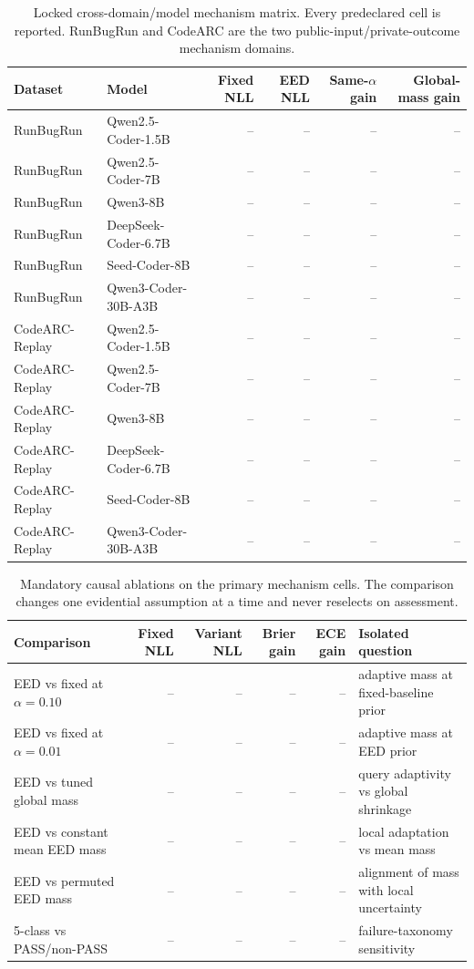 \begin{table}[t]
\centering
\caption{Locked cross-domain/model mechanism matrix. Every predeclared cell is reported.
RunBugRun and CodeARC are the two public-input/private-outcome mechanism domains.}
\label{tab:eesd-mechanism-matrix}
\small
\begin{tabular}{llrrrr}
\toprule
Dataset & Model & Fixed NLL & EED NLL & Same-$\alpha$ gain & Global-mass gain \\
\midrule
RunBugRun & Qwen2.5-Coder-1.5B & -- & -- & -- & -- \\
RunBugRun & Qwen2.5-Coder-7B & -- & -- & -- & -- \\
RunBugRun & Qwen3-8B & -- & -- & -- & -- \\
RunBugRun & DeepSeek-Coder-6.7B & -- & -- & -- & -- \\
RunBugRun & Seed-Coder-8B & -- & -- & -- & -- \\
RunBugRun & Qwen3-Coder-30B-A3B & -- & -- & -- & -- \\
CodeARC-Replay & Qwen2.5-Coder-1.5B & -- & -- & -- & -- \\
CodeARC-Replay & Qwen2.5-Coder-7B & -- & -- & -- & -- \\
CodeARC-Replay & Qwen3-8B & -- & -- & -- & -- \\
CodeARC-Replay & DeepSeek-Coder-6.7B & -- & -- & -- & -- \\
CodeARC-Replay & Seed-Coder-8B & -- & -- & -- & -- \\
CodeARC-Replay & Qwen3-Coder-30B-A3B & -- & -- & -- & -- \\
\bottomrule
\end{tabular}
\end{table}

\begin{table}[t]
\centering
\caption{Mandatory causal ablations on the primary mechanism cells. The comparison
changes one evidential assumption at a time and never reselects on assessment.}
\label{tab:eesd-causal-ablation}
\small
\begin{tabular}{lrrrrl}
\toprule
Comparison & Fixed NLL & Variant NLL & Brier gain & ECE gain & Isolated question \\
\midrule
EED vs fixed at $\alpha=0.10$ & -- & -- & -- & -- & adaptive mass at fixed-baseline prior \\
EED vs fixed at $\alpha=0.01$ & -- & -- & -- & -- & adaptive mass at EED prior \\
EED vs tuned global mass & -- & -- & -- & -- & query adaptivity vs global shrinkage \\
EED vs constant mean EED mass & -- & -- & -- & -- & local adaptation vs mean mass \\
EED vs permuted EED mass & -- & -- & -- & -- & alignment of mass with local uncertainty \\
5-class vs PASS/non-PASS & -- & -- & -- & -- & failure-taxonomy sensitivity \\
\bottomrule
\end{tabular}
\end{table}


